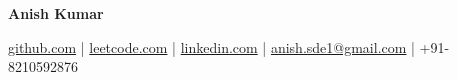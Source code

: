 \documentclass[a4paper,11pt]{article}
\makeatletter
\newcommand{\name}{ Anish Kumar} %
\newcommand{\phone}{8210592876} %
\newcommand{\emaila}{anish.sde1@gmail.com} %
\newcommand{\github}{anishkt2000} %
\newcommand{\linkedin}{anishkt20} %
\newcommand{\leetcode}{Anish-Kumar} %
\makeatother
\begin{document}
\selectfont

\begin{center}
    \LARGE{\textbf{\name}}
\end{center}
\vspace{-3.5mm}
\begin{center}
    \small{\href{https://github.com/\github}{\faGithub \hspace{0.2mm} github.com} |  
  \href{https://leetcode.com/\leetcode/}{\faCode \hspace{0.2mm} leetcode.com} | 
    \href{https://www.linkedin.com/in/\linkedin/}{\faLinkedin \hspace{0.2mm} linkedin.com} | 
    \href{mailto:\emaila}{\faEnvelope \hspace{0.2mm} \emaila} | 
    \faPhone \hspace{0.2mm} +91-\phone }
\end{center}


  
\end{document}
